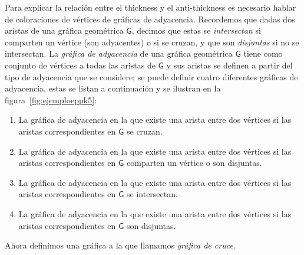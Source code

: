 
Para explicar la relación entre el thickness y el anti-thickness es necesario
hablar de coloraciones de vértices de gráficas de adyacencia. Recordemos que
dadas dos aristas de una gráfica geométrica $\mathsf{G}$, decimos que estas
se \emph{intersectan} si comparten un vértice (son adyacentes) o si se cruzan,
y que son \emph{disjuntas} si no se intersectan. La \emph{gráfica de
adyacencia} de una gráfica geométrica $\mathsf{G}$ tiene como conjunto de
vértices a todas las aristas de $\mathsf{G}$ y sus aristas se definen a partir
del tipo de adyacencia que se considere; se puede definir cuatro diferentes
gráficas de adyacencia, estas se listan a continuación y se ilustran en la
figura~\ref{fig:ejemploeppk5}:
\begin{enumerate}
  \item \label{itm:epp}La gráfica de adyacencia en la que existe una arista
  entre dos vértices si las aristas correspondientes en $\mathsf{G}$ se cruzan.
  \item  \label{itm:W} La gráfica de adyacencia en la que existe una arista
  entre dos vértices si las aristas correspondientes en $\mathsf{G}$ comparten
  un vértice o son disjuntas.
  \item  \label{itm:I} La gráfica de adyacencia en la que existe una arista
  entre dos vértices si las aristas correspondientes en $\mathsf{G}$ se
  intersectan.
  \item \label{itm:D}  La gráfica de adyacencia en la que existe una arista
  entre dos vértices si las aristas correspondientes en $\mathsf{G}$ son
  disjuntas.
\end{enumerate}

Ahora definimos una gráfica a la que llamamos \emph{gráfica de cruce}.

